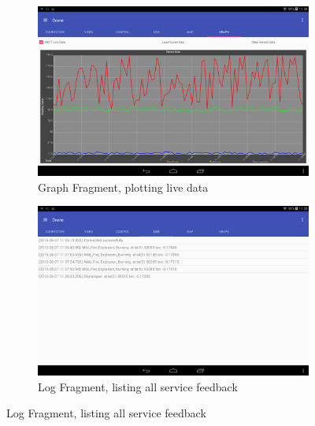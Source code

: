 \documentclass{article}
\begin{document}
\begin{landscape}
\begin{figure}[h]
\begin{subfigure}[b]{.45\linewidth}
\includegraphics[width=\linewidth]{GraphFragment}
\caption{Graph Fragment, plotting live data}
\end{subfigure}
\begin{subfigure}[b]{.45\linewidth}
\includegraphics[width=\linewidth]{LogFragment}
\caption{Log Fragment, listing all service feedback}
\end{subfigure}

\end{figure}
\end{landscape}
\end{document}
